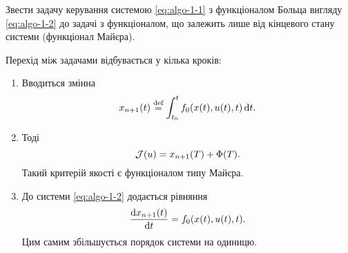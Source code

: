 \vspace*{\baselineskip}

\begin{problem*}
	Звести задачу керування системою \eqref{eq:algo-1-1} з функціоналом Больца вигляду \eqref{eq:algo-1-2}  до задачі з функціоналом, що залежить лише від кінцевого стану системи (функціонал Майєра).
\end{problem*}

\begin{algorithm}
    \label{algo-1-2}
    Перехід між задачами відбувається у кілька кроків:
	\begin{enumerate}
		\item Вводиться змінна \[x_{n+1} (t) \overset{\text{def}}{=} \int_{t_0}^t f_0(x(t), u(t), t) \mathop{}\!\mathrm{d} t.\]
		\item Тоді \[ \mathcal{J}(u) = x_{n+1} (T) + \Phi(T). \]
		Такий критерій якості є функціоналом типу Майєра.
		\item До системи \eqref{eq:algo-1-2} додається рівняння \[ \frac{\mathop{}\!\mathrm{d} x_{n+1}(t)}{\mathop{}\!\mathrm{d} t} = f_0(x(t), u(t), t). \]
		Цим самим збільшується порядок системи на одиницю.
	\end{enumerate}
\end{algorithm}
